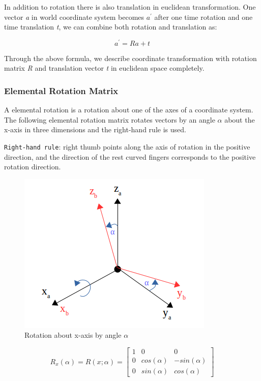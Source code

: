 In addition to rotation there is also translation in euclidean transformation. One vector \textit{a} in world coordinate system becomes \textit{$a^{\prime}$} after one time rotation and one time translation \textit{t}, we can combine both rotation and translation as:

\begin{equation*}
a^{\prime} = Ra + t
\end{equation*}

Through the above formula, we describe coordinate transformation with rotation matrix \textit{R} and translation vector \textit{t} in euclidean space completely. 


\subsubsection{Elemental Rotation Matrix}
A elemental rotation is a rotation about one of the axes of a coordinate system. The following elemental rotation matrix rotates vectors by an angle $\alpha$ about the x-axis in three dimensions and the right-hand rule is used.

\texttt{Right-hand rule}: right thumb points along the axis of rotation in the positive direction, and the direction of the rest curved fingers corresponds to the positive rotation direction.

\begin{figure}[h]
\centering
\includegraphics[scale=0.5]{./fig/rotationx.png}
\caption{Rotation about x-axis by angle $\alpha$}
\label{fig:rotationx}
\end{figure}

\begin{equation*}
R_x(\alpha) = R(x;\alpha)
      = \begin{bmatrix} 1 & 0 & 0\\
                        0 & cos(\alpha) & -sin(\alpha)\\
                        0 & sin(\alpha) & cos(\alpha) \end{bmatrix}                
\end{equation*}

